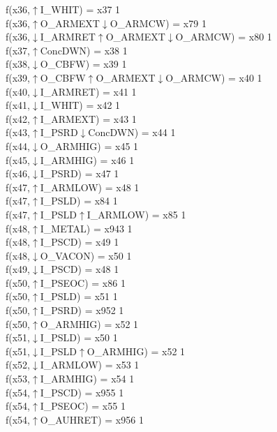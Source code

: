 f(x36,$\uparrow$I\_WHIT) = x37 {1} \\
f(x36,$\uparrow$O\_ARMEXT$\downarrow$O\_ARMCW) = x79 {1} \\
f(x36,$\downarrow$I\_ARMRET$\uparrow$O\_ARMEXT$\downarrow$O\_ARMCW) = x80 {1} \\
f(x37,$\uparrow$ConcDWN) = x38 {1} \\
f(x38,$\downarrow$O\_CBFW) = x39 {1} \\
f(x39,$\uparrow$O\_CBFW$\uparrow$O\_ARMEXT$\downarrow$O\_ARMCW) = x40 {1} \\
f(x40,$\downarrow$I\_ARMRET) = x41 {1} \\
f(x41,$\downarrow$I\_WHIT) = x42 {1} \\
f(x42,$\uparrow$I\_ARMEXT) = x43 {1} \\
f(x43,$\uparrow$I\_PSRD$\downarrow$ConcDWN) = x44 {1} \\
f(x44,$\downarrow$O\_ARMHIG) = x45 {1} \\
f(x45,$\downarrow$I\_ARMHIG) = x46 {1} \\
f(x46,$\downarrow$I\_PSRD) = x47 {1} \\
f(x47,$\uparrow$I\_ARMLOW) = x48 {1} \\
f(x47,$\uparrow$I\_PSLD) = x84 {1} \\
f(x47,$\uparrow$I\_PSLD$\uparrow$I\_ARMLOW) = x85 {1} \\
f(x48,$\uparrow$I\_METAL) = x943 {1} \\
f(x48,$\uparrow$I\_PSCD) = x49 {1} \\
f(x48,$\downarrow$O\_VACON) = x50 {1} \\
f(x49,$\downarrow$I\_PSCD) = x48 {1} \\
f(x50,$\uparrow$I\_PSEOC) = x86 {1} \\
f(x50,$\uparrow$I\_PSLD) = x51 {1} \\
f(x50,$\uparrow$I\_PSRD) = x952 {1} \\
f(x50,$\uparrow$O\_ARMHIG) = x52 {1} \\
f(x51,$\downarrow$I\_PSLD) = x50 {1} \\
f(x51,$\downarrow$I\_PSLD$\uparrow$O\_ARMHIG) = x52 {1} \\
f(x52,$\downarrow$I\_ARMLOW) = x53 {1} \\
f(x53,$\uparrow$I\_ARMHIG) = x54 {1} \\
f(x54,$\uparrow$I\_PSCD) = x955 {1} \\
f(x54,$\uparrow$I\_PSEOC) = x55 {1} \\
f(x54,$\uparrow$O\_AUHRET) = x956 {1} \\
